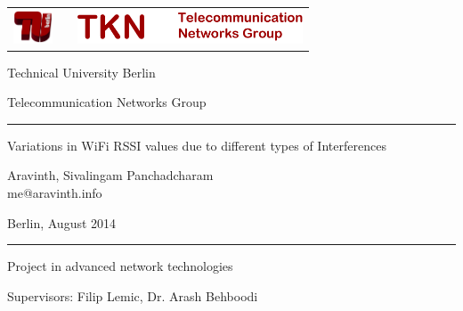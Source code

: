 \documentclass[11pt,a4paper,headinclude,footinclude,chapterprefix=on]{scrreprt}
\makeatletter
\newcommand{\trdate}{August 2014}
\newcommand{\trauthor}{Aravinth, Sivalingam Panchadcharam}
\newcommand{\tremail}{me@aravinth.info}
\newcommand{\trtitle}{Variations in WiFi RSSI values due to different types of Interferences}
\makeatother
\begin{document}
 


{ \sffamily

\thispagestyle{empty} 
\begin{tabularx}
	{\columnwidth}{cXc} 
	\includegraphics[height=1cm]{Images/TU-Logo-3D-rot.pdf} & & 
	\includegraphics[height=1cm]{Images/tknlogo.pdf} \\
\end{tabularx}

\vspace{1.0cm} 
\begin{center}
	{\huge 
	\noindent Technical University Berlin
	
	\vspace{0.5cm}
	
	\noindent Telecommunication Networks Group 
	\begin{center}
		\rule{15.5cm}{0.4pt} 
	\end{center}
	} 
\end{center}
\begin{minipage}
	[][11.0cm][c]{14.5cm} {\Huge 
	\begin{center}
		\trtitle 
	\end{center}
	\begin{center}
		\trauthor \\
		{\Large \tremail} 
	\end{center}
	\begin{center}
		Berlin, \trdate 
	\end{center}
	
	\vspace{0.5cm}
	
	} 
\end{minipage}

\setlength{\fboxrule}{0.4pt} \setlength{\fboxsep}{0.4pt} 
\begin{center}
	
	\rule{15.5cm}{0.4pt}
	
	\vspace{0.5cm}
	
	{\huge {Project in advanced network technologies}}
	
	\vspace{0.5cm}
	
	{\huge Supervisors: Filip Lemic, Dr. Arash Behboodi}
	
	\vspace{0.5cm} 
\end{center}
}
\end{document}
